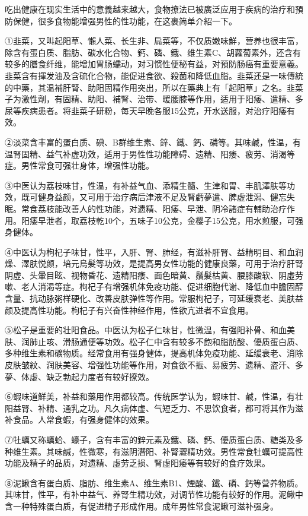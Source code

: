 \documentclass[12pt,UTF8]{ctexbook}
\begin{document}
吃出健康在现实生活中的意義越来越大，食物撩法已被廣泛应用于疾病的治疗和預防保健，很多食物能增强男性的性功能，在这裹简单介紹一下。

①韭菜，又叫起阳草、懶人菜、长生非、扁菜等，不仅质嫩味鮮，营养也很丰富，除含有蛋白质、脂肪、碳水化合物、鈣、磷、鐵、维生素C、胡蘿蔔素外，还含有较多的膳食纤维，能增加胃肠蠕动，对习惯性便秘有益，对預防肠癌有重要意義。韭菜含有揮发油及含硫化合物，能促进食欲、殺菌和降低血脂。韭菜还是一味傳統的中藥，其温補肝腎、助阳固精作用突出，所以在藥典上有「起阳草」之名。韭菜子为激性劑，有固精、助阳、補腎、治带、暖腰膝等作用，适用于阳痿、遣精、多尿等疾病患者。将韭菜子研粉，每天早晚各服15公克，开水送服，对治疗阳痿有效。

②淡菜含丰富的蛋白质、碘、B群维生素、鋅、鐵、鈣、磷等。其味鹹，性温，有温腎固精、益气补虚功效，适用于男性性功能障碍、遗精、阳痿、疲劳、消渴等症。男性常食可强壮身体，增强性功能。

③中医认为荔枝味甘，性温，有补益气血、添精生髓、生津和胃、丰肌澤肤等功效，既可健身益颜，又可用于治疗病后津液不足及腎虧夢遣、脾虚泄潟、健忘失眠。常食荔枝能改善人的性功能，对遗精、阳痿、早泄、阴冷諸症有輔助治疗作用。阳痿早泄者，取荔枝乾10个，五味子10公克，金樱子15公克，用水煎服，可强身健体。

④中医认为枸杞子味甘，性平，入肝、腎、肺经，有滋补肝腎、益精明目、和血润燥、澤肤悦颜，培元烏髮等功效，是提高男女性功能的健康良藥，可用于治疗肝腎阴虛、头暈目眩、视物昏花、遗精阳痿、面色暗黄、鬚髮枯黄、腰膝酸软、阴虛劳嗽、老人消渴等症。枸杞子有增强机体免疫功能、促进细胞代谢、降低血中膽固醇含量、抗动脉粥样硬化、改善皮肤弹性等作用。常服枸杞子，可延缓衰老、美肤益颜及提高性功能。枸杞子有兴奋性神经作用，性欲亢进者不宜食用。

⑤松子是重要的壮阳食品。中医认为松子仁味甘，性微温，有强阳补骨、和血美肤、润肺止咳、滑肠通便等功效。松子仁中含有较多不飽和脂肪酸、優质蛋白质、多种维生素和礦物质。经常食用有强身健体，提高机体免疫功能、延缓衰老、消除皮肤皱紋、润肤美容、增强性功能等作用，对食欲不振、易疲劳、遗精、盗汗、多夢、体虚、缺乏勃起力度者有较好撩效。

⑥蝦味道鮮美，补益和藥用作用都较高。传统医学认为，蝦味甘、鹹，性温，有壮阳益腎、补精、通乳之功。凡久病体虚、气短乏力、不思饮食者，都可将其作为滋补食品。人常食蝦，有强身健体的效果。

⑦牡蠣又称蠣蛤、蠔子，含有丰富的鋅元素及鐵、磷、鈣、優质蛋白质、糖类及多种维生素。其味鹹，性微寒，有滋阴潛阳、补腎澀精功效。男性常食牡蠣可提高性功能及精子的品质，对遗精、虛劳乏损、腎虛阳痿等有较好的食疗效果。

⑧泥鳅含有蛋白质、脂肪、维生素A、维生素B1、煙酸、鐵、磷、鈣等营养物质。其味甘，性平，有补中益气、养腎生精功效，对调节性功能有较好的作用。泥鳅中含一种特殊蛋白质，有促进精子形成作用。成年男性常食泥鳅可滋补强身。
\end{document}
